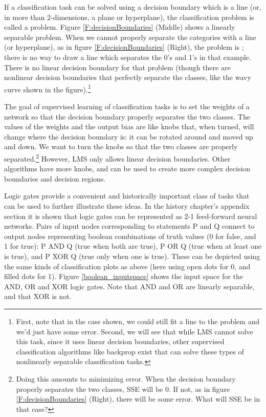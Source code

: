 If a classification task can be solved using a decision boundary which is a line (or, in more than 2-dimensions, a plane or hyperplane), the classification problem is called a  problem. Figure \ref{F:decisionBoundaries} (Middle) shows a linearly separable problem. When we cannot properly separate the categories with a line (or hyperplane), as in figure \ref{F:decisionBoundaries} (Right), the problem is ; there is no way to draw a line which separates the 0's and 1's in that example. There is no linear decision boundary for that problem (though there are nonlinear decision boundaries that perfectly separate the classes, like the wavy curve shown in the figure).\footnote{First, note that in the case shown, we could still fit a line to the problem and we'd just have some error. Second, we will see that while LMS cannot solve this task, since it uses linear decision boundaries, other supervised classification algorithms like backprop exist that can solve these types of nonlinearly separable classification tasks.}

The goal of supervised learning of classification tasks is to set the weights of a network so that the decision boundary properly separates the two classes. The values of the weights and the output bias are like knobs that, when turned, will change where the decision boundary is: it can be rotated around and moved up and down. We want to turn the knobs so that the two classes are properly separated.\footnote{Doing this amounts to minimizing error. When the decision boundary properly separates the two classes, SSE will be 0. If not, as in figure \ref{F:decisionBoundaries} (Right), there will be some error. What will SSE be in that case?}  However, LMS only allows linear decision boundaries. Other algorithms have more knobs, and can be used to create more complex decision boundaries and decision regions.

Logic gates provide a convenient and historically important class of tasks that can be used to further illustrate these ideas. In the history chapter's appendix section  it is shown that logic gates can be represented as 2-1 feed-forward neural networks. Pairs of input nodes corresponding to statements P and Q connect to output nodes representing boolean combinations of truth values (0 for false, and 1 for true): P AND Q (true when both are true), P OR Q (true when at least one is true), and P XOR Q (true only when one is true). These can be depicted using the same kinds of classification plots as above (here using open dots for 0, and filled dots for 1). Figure \ref{boolean_inputspace} shows the input space for the AND, OR and XOR logic gates. Note that AND and OR are linearly separable, and that XOR is not.

